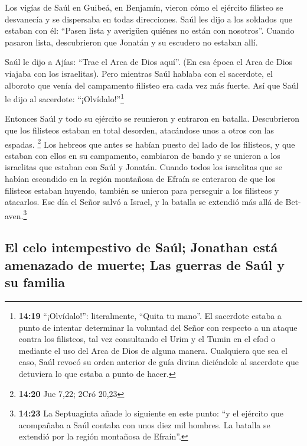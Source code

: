  Los vigías de Saúl en Guibeá, en Benjamín, vieron cómo
el ejército filisteo se desvanecía y se dispersaba en todas direcciones.
 Saúl les dijo a los soldados que estaban con él: ``Pasen
lista y averigüen quiénes no están con nosotros''. Cuando pasaron lista,
descubrieron que Jonatán y su escudero no estaban allí.

 Saúl le dijo a Ajías: ``Trae el Arca de Dios aquí''. (En
esa época el Arca de Dios viajaba con los israelitas). 
Pero mientras Saúl hablaba con el sacerdote, el alboroto que venía del
campamento filisteo era cada vez más fuerte. Así que Saúl le dijo al
sacerdote: ``¡Olvídalo!''\footnote{\textbf{14:19} ``¡Olvídalo!'':
  literalmente, ``Quita tu mano''. El sacerdote estaba a punto de
  intentar determinar la voluntad del Señor con respecto a un ataque
  contra los filisteos, tal vez consultando el Urim y el Tumin en el
  efod o mediante el uso del Arca de Dios de alguna manera. Cualquiera
  que sea el caso, Saúl revocó su orden anterior de guía divina
  diciéndole al sacerdote que detuviera lo que estaba a punto de hacer.}

 Entonces Saúl y todo su ejército se reunieron y entraron
en batalla. Descubrieron que los filisteos estaban en total desorden,
atacándose unos a otros con las espadas. \footnote{\textbf{14:20} Jue
  7,22; 2Cró 20,23}  Los hebreos que antes se habían
puesto del lado de los filisteos, y que estaban con ellos en su
campamento, cambiaron de bando y se unieron a los israelitas que estaban
con Saúl y Jonatán.  Cuando todos los israelitas que se
habían escondido en la región montañosa de Efraín se enteraron de que
los filisteos estaban huyendo, también se unieron para perseguir a los
filisteos y atacarlos.  Ese día el Señor salvó a Israel,
y la batalla se extendió más allá de Bet-aven.\footnote{\textbf{14:23}
  La Septuaginta añade lo siguiente en este punto: ``y el ejército que
  acompañaba a Saúl contaba con unos diez mil hombres. La batalla se
  extendió por la región montañosa de Efraín''.}

\hypertarget{el-celo-intempestivo-de-sauxfal-jonathan-estuxe1-amenazado-de-muerte-las-guerras-de-sauxfal-y-su-familia}{%
\subsection{El celo intempestivo de Saúl; Jonathan está amenazado de
muerte; Las guerras de Saúl y su
familia}\label{el-celo-intempestivo-de-sauxfal-jonathan-estuxe1-amenazado-de-muerte-las-guerras-de-sauxfal-y-su-familia}}

